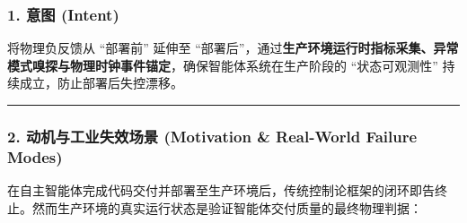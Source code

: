 \subsubsection{1. 意图 (Intent)}\label{ux610fux56fe-intent-22}

将物理负反馈从 ``部署前'' 延伸至
``部署后''，通过\textbf{生产环境运行时指标采集、异常模式嗅探与物理时钟事件锚定}，确保智能体系统在生产阶段的
``状态可观测性'' 持续成立，防止部署后失控漂移。

\begin{center}\rule{0.5\linewidth}{0.5pt}\end{center}

\subsubsection{2. 动机与工业失效场景 (Motivation \& Real-World Failure
Modes)}\label{ux52a8ux673aux4e0eux5de5ux4e1aux5931ux6548ux573aux666f-motivation-real-world-failure-modes-22}

在自主智能体完成代码交付并部署至生产环境后，传统控制论框架的闭环即告终止。然而生产环境的真实运行状态是验证智能体交付质量的最终物理判据：

